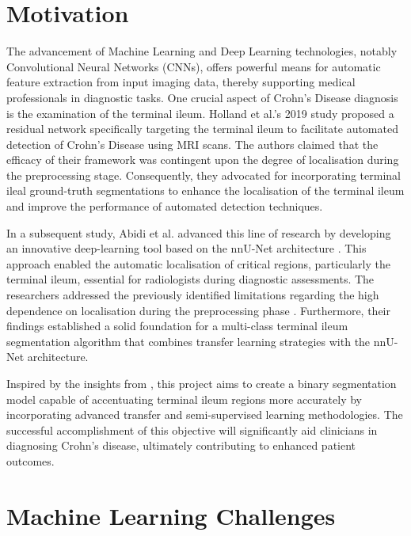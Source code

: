 \section{Motivation}

The advancement of Machine Learning and Deep Learning technologies, notably Convolutional Neural Networks (CNNs), offers powerful means for automatic feature extraction from input imaging data, thereby supporting medical professionals in diagnostic tasks. One crucial aspect of Crohn's Disease diagnosis is the examination of the terminal ileum. Holland et al.'s 2019 study \cite{holland2019automatic} proposed a residual network specifically targeting the terminal ileum to facilitate automated detection of Crohn's Disease using MRI scans. The authors claimed that the efficacy of their framework was contingent upon the degree of localisation during the preprocessing stage. Consequently, they advocated for incorporating terminal ileal ground-truth segmentations to enhance the localisation of the terminal ileum and improve the performance of automated detection techniques.

In a subsequent study, Abidi et al. \cite{Ali2022} advanced this line of research by developing an innovative deep-learning tool based on the nnU-Net architecture \cite{isensee2021nnu}. This approach enabled the automatic localisation of critical regions, particularly the terminal ileum, essential for radiologists during diagnostic assessments. The researchers addressed the previously identified limitations regarding the high dependence on localisation during the preprocessing phase \cite{holland2019automatic}. Furthermore, their findings established a solid foundation for a multi-class terminal ileum segmentation algorithm that combines transfer learning strategies with the nnU-Net architecture.

Inspired by the insights from \cite{holland2019automatic, Ali2022}, this project aims to create a binary segmentation model capable of accentuating terminal ileum regions more accurately by incorporating advanced transfer and semi-supervised learning methodologies. The successful accomplishment of this objective will significantly aid clinicians in diagnosing Crohn's disease, ultimately contributing to enhanced patient outcomes.

\section{Machine Learning Challenges}

